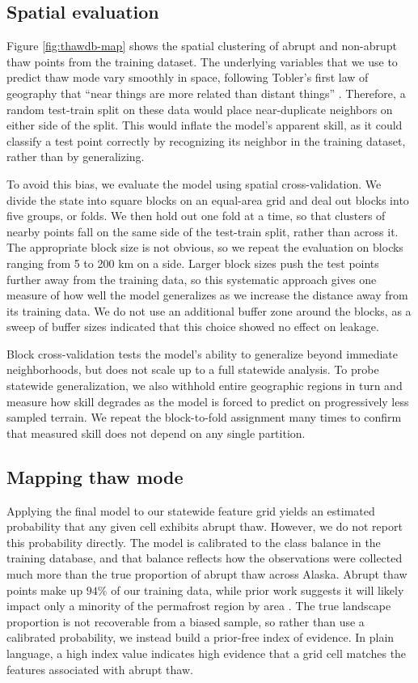 \documentclass[../main.tex]{subfiles}
\begin{document}
\subsection{Spatial evaluation}

Figure \ref{fig:thawdb-map} shows the spatial clustering of abrupt and non-abrupt thaw points from the training dataset. The underlying variables that we use to predict thaw mode vary smoothly in space, following Tobler's first law of geography that ``near things are more related than distant things'' \citep{tobler1970computer}. Therefore, a random test-train split on these data would place near-duplicate neighbors on either side of the split. This would inflate the model's apparent skill, as it could classify a test point correctly by recognizing its neighbor in the training dataset, rather than by generalizing.

To avoid this bias, we evaluate the model using spatial cross-validation. We divide the state into square blocks on an equal-area grid and deal out blocks into five groups, or folds. We then hold out one fold at a time, so that clusters of nearby points fall on the same side of the test-train split, rather than across it. The appropriate block size is not obvious, so we repeat the evaluation on blocks ranging from 5 to 200 km on a side. Larger block sizes push the test points further away from the training data, so this systematic approach gives one measure of how well the model generalizes as we increase the distance away from its training data. We do not use an additional buffer zone around the blocks, as a sweep of buffer sizes indicated that this choice showed no effect on leakage.

Block cross-validation tests the model's ability to generalize beyond immediate neighborhoods, but does not scale up to a full statewide analysis. To probe statewide generalization, we also withhold entire geographic regions in turn and measure how skill degrades as the model is forced to predict on progressively less sampled terrain. We repeat the block-to-fold assignment many times to confirm that measured skill does not depend on any single partition.

\subsection{Mapping thaw mode}

Applying the final model to our statewide feature grid yields an estimated probability that any given cell exhibits abrupt thaw. However, we do not report this probability directly. The model is calibrated to the class balance in the training database, and that balance reflects how the observations were collected much more than the true proportion of abrupt thaw across Alaska. Abrupt thaw points make up $94\%$ of our training data, while prior work suggests it will likely impact only a minority of the permafrost region by area \citep{turetsky2020carbon}. The true landscape proportion is not recoverable from a biased sample, so rather than use a calibrated probability, we instead build a prior-free index of evidence. In plain language, a high index value indicates high evidence that a grid cell matches the features associated with abrupt thaw.
\end{document}

